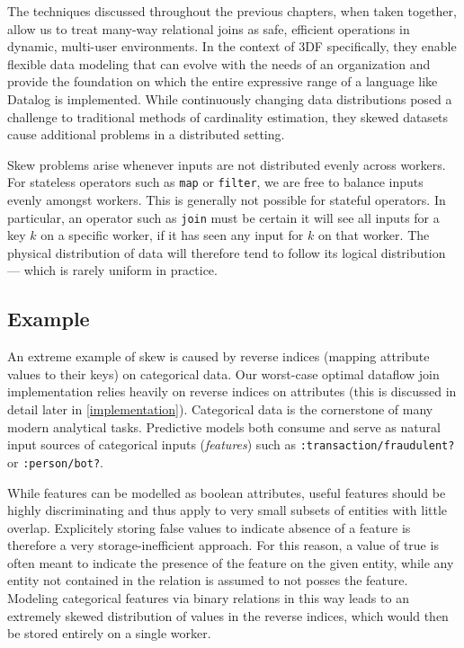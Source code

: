 \documentclass[../catalog.tex]{subfiles}
\begin{document}
The techniques discussed throughout the previous chapters, when taken
together, allow us to treat many-way relational joins as safe,
efficient operations in dynamic, multi-user environments. In the
context of 3DF specifically, they enable flexible data modeling that
can evolve with the needs of an organization and provide the
foundation on which the entire expressive range of a language like
Datalog is implemented. While continuously changing data distributions
posed a challenge to traditional methods of cardinality estimation,
they skewed datasets cause additional problems in a distributed
setting.

Skew problems arise whenever inputs are not distributed evenly across
workers. For stateless operators such as \texttt{map} or
\texttt{filter}, we are free to balance inputs evenly amongst
workers. This is generally not possible for stateful operators. In
particular, an operator such as \texttt{join} must be certain it will
see all inputs for a key $k$ on a specific worker, if it has seen any
input for $k$ on that worker. The physical distribution of data will
therefore tend to follow its logical distribution — which is rarely
uniform in practice.

\subsection{Example}

An extreme example of skew is caused by reverse indices (mapping
attribute values to their keys) on categorical data. Our worst-case
optimal dataflow join implementation relies heavily on reverse indices
on attributes (this is discussed in detail later in
\autoref{implementation}). Categorical data is the cornerstone of many
modern analytical tasks. Predictive models both consume and serve as
natural input sources of categorical inputs (\emph{features}) such as
\texttt{:transaction/fraudulent?} or \texttt{:person/bot?}.

While features can be modelled as boolean attributes, useful features
should be highly discriminating and thus apply to very small subsets
of entities with little overlap. Explicitely storing false values to
indicate absence of a feature is therefore a very storage-inefficient
approach. For this reason, a value of true is often meant to indicate
the presence of the feature on the given entity, while any entity not
contained in the relation is assumed to not posses the
feature. Modeling categorical features via binary relations in this
way leads to an extremely skewed distribution of values in the reverse
indices, which would then be stored entirely on a single worker.
\end{document}
